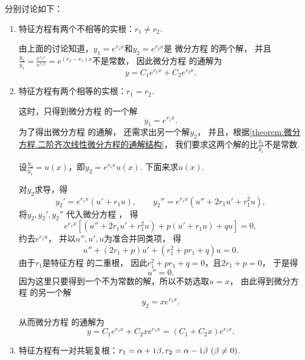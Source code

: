 分别讨论如下：\begin{enumerate}
	\item 特征方程有两个不相等的实根：\(r_1 \neq r_2\).

	由上面的讨论知道，\(y_1 = e^{r_1 x}\)和\(y_2 = e^{r_2 x}\)是
	微分方程  的两个解，
	并且\(\frac{y_2}{y_1} = \frac{e^{r_2 x}}{e^{r_1 x}} = e^{(r_2-r_1) x}\)不是常数，
	因此微分方程  的通解为\[
		y = C_1 e^{r_1 x} + C_2 e^{r_2 x}.
	\]

	\item 特征方程有两个相等的实根：\(r_1 = r_2\).

	这时，只得到微分方程  的一个解\[
		y_1 = e^{r_1 x}.
	\]
	为了得出微分方程  的通解，
	还需求出另一个解\(y_2\)，
	并且，根据\cref{theorem:微分方程.二阶齐次线性微分方程的通解结构}，
	我们要求这两个解的比\(\frac{y_2}{y_1}\)不是常数.

	设\(\frac{y_2}{y_1} = u(x)\)，即\(y_2 = e^{r_1 x} u(x)\).
	下面来求\(u(x)\).

	对\(y_2\)求导，得\[
		y_2' = e^{r_1 x} (u' + r_1 u),
		\qquad
		y_2'' = e^{r_1 x} (u'' + 2 r_1 u' + r_1^2 u),
	\]
	将\(y_2,y_2',y_2''\)
	代入微分方程 ，
	得\[
		e^{r_1 x} [(u'' + 2 r_1 u' + r_1^2 u) + p(u' + r_1 u) + qu] = 0,
	\]
	约去\(e^{r_1 u}\)，
	并以\(u'',u',u\)为准合并同类项，
	得\[
		u'' + (2 r_1 + p) u' + (r_1^2 + p r_1 + q) u = 0.
	\]
	由于\(r_1\)是特征方程  的二重根，
	因此\(r_1^2 + p r_1 + q = 0\)，且\(2 r_1 + p = 0\)，
	于是得\[
		u'' = 0.
	\]
	因为这里只要得到一个不为常数的解，所以不妨选取\(u = x\)，
	由此得到微分方程  的另一个解\[
		y_2 = x e^{r_1 x}.
	\]

	从而微分方程  的通解为\[
		y = C_1 e^{r_1 x} + C_2 x e^{r_1 x}
		= (C_1 + C_2 x) e^{r_1 x}.
	\]

	\item 特征方程有一对共轭复根：\(r_1 = \alpha+\kern1pt\mathrm{i}\kern1pt\beta, r_2 = \alpha-\kern1pt\mathrm{i}\kern1pt\beta \ (\beta\neq0)\).


\end{enumerate}
